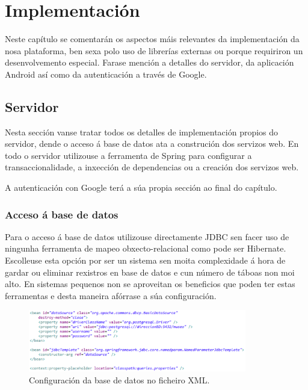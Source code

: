 \chapter{Implementación}

Neste capítulo se comentarán os aspectos máis relevantes da implementación da nosa plataforma, ben sexa polo uso de librerías externas ou porque requiriron un desenvolvemento especial. Farase mención a detalles do servidor, da aplicación Android así como da autenticación a través de Google.


\section{Servidor}
Nesta sección vanse tratar todos os detalles de implementación propios do servidor, dende o acceso á base de datos ata a construción dos servizos web. En todo o servidor utilizouse a ferramenta de Spring para configurar a transaccionalidade, a inxección de dependencias ou a creación dos servizos web.

A autenticación con Google terá a súa propia sección ao final do capítulo.


\subsection{Acceso á base de datos}
Para o acceso á base de datos utilizouse directamente JDBC sen facer uso de ningunha ferramenta de mapeo obxecto-relacional como pode ser Hibernate. Escolleuse esta opción por ser un sistema sen moita complexidade á hora de gardar ou eliminar rexistros en base de datos e cun número de táboas non moi alto. En sistemas pequenos non se aproveitan os beneficios que poden ter estas ferramentas e desta maneira afórrase a súa configuración.

\begin{figure}[tbh] 
	\begin{center}
		\includegraphics[width=0.85\textwidth]{figures/codigo/configuracionBD}
		\caption{Configuración da base de datos no ficheiro XML.}
		\label{fig:configuracionBD}
	\end{center}
\end{figure}

